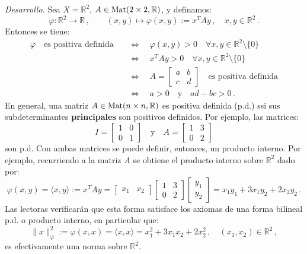 \smallskip\noindent
\emph{Desarrollo.}
Sea $X=\mathbb{R}^2$, $A\in{\rm Mat}(2\times 2,\mathbb{R})$, y definamos:
\begin{equation*}
\varphi: \mathbb{R}^2 \rightarrow \mathbb{R}\,,\qquad
(x,y)\mapsto \varphi(x,y):= x^{T}Ay\,,\quad x,y\in\mathbb{R}^2\,.
\end{equation*}
Entonces se tiene:
\begin{align*}
\varphi\quad\text{es positiva definida}\quad
& \Leftrightarrow\quad \varphi(x,y)> 0\quad
  \forall x,y\in\mathbb{R}^2\setminus\{0\} \\
& \Leftrightarrow\quad x^{T}Ay> 0\quad
  \forall x,y\in\mathbb{R}^2\setminus\{0\}\quad \\
& \Leftrightarrow\quad 
  A=\begin{bmatrix} a & b \\ c & d \end{bmatrix}\quad
  \text{es positiva definida} \\
& \Leftrightarrow\quad 
  a>0\quad\text{y}\quad ad-bc>0\,.
\end{align*}
En general, una matriz $A\in{\rm Mat}(n\times n,\mathbb{R})$
es positiva definida (p.d.) ssi sus subdeterminantes
{\color{red}\bf principales} son positivos definidos.
Por ejemplo, las matrices:
$$
I=\begin{bmatrix} 1 & 0 \\ 0 & 1 \end{bmatrix}
\quad\text{y}\quad 
A=\begin{bmatrix} 1 & 3 \\ 0 & 2 \end{bmatrix}
$$
son p.d.
Con ambas matrices se puede definir, entonces, un producto interno.
Por ejemplo, recurriendo a la matriz $A$ se obtiene el producto interno
sobre $\mathbb{R}^2$ dado por:
$$
\varphi(x,y) = \langle x,y\rangle := x^{T}Ay
= \begin{bmatrix} x_1 & x_2 \end{bmatrix}
  \begin{bmatrix} 1 & 3 \\ 0 & 2 \end{bmatrix}
  \begin{bmatrix} y_1 \\ y_2 \end{bmatrix}
= x_1y_1 + 3x_1 y_2 + 2 x_2 y_2\,.
$$
Las lectoras verificar\'an que esta forma satisface los axiomas de una
forma bilineal p.d. o producto interno, en particular que:
$$
\|x\|_\varphi^2 := \varphi(x,x) = \langle x,x\rangle
= x_1^2 + 3x_1 x_2 + 2 x_2^2\,,\quad (x_1,x_2)\in\mathbb{R}^2\,,
$$
es efectivamente una norma sobre $\mathbb{R}^2$.


